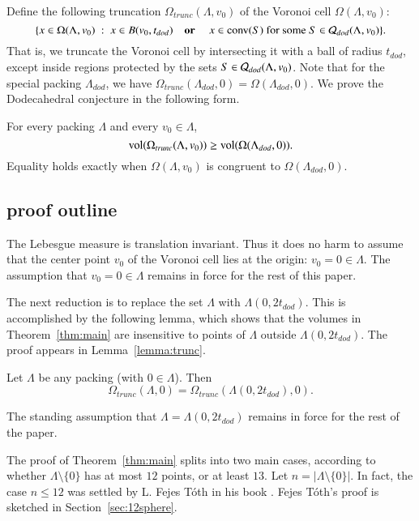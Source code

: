 Define the following truncation $\Omega_{trunc}(\Lambda,v_0)$ 
of the Voronoi cell $\Omega(\Lambda,v_0)$:
   $$
   \{x \in \Omega(\Lambda,v_0) \ :\    x\in B(v_0,t_{dod}) \quad\text{\bf  or }\quad x \in {\operatorname{conv}}(S)
     \text{ for some } S\in {\mathcal Q}_{dod}(\Lambda,v_0) \}. 
   $$
That is, we truncate the Voronoi cell by intersecting it with a ball of radius $t_{dod}$,
except inside regions protected by the sets $S\in{\mathcal Q}_{dod}(\Lambda,v_0)$.
Note that for the special packing $\Lambda_{dod}$, we have 
$\Omega_{trunc}(\Lambda_{dod},0) = \Omega(\Lambda_{dod},0)$.
We prove the  Dodecahedral conjecture in the following form.

\begin{theorem}\label{thm:main}
For every packing $\Lambda$ and every $v_0\in\Lambda$,
   $$
   {\operatorname{vol}}(\Omega_{trunc}(\Lambda,v_0))\ge {\operatorname{vol}}(\Omega(\Lambda_{dod},0)).
   $$
Equality holds exactly when $\Omega(\Lambda,v_0)$ is congruent to
$\Omega(\Lambda_{dod},0)$.
\end{theorem}





\subsection{proof outline}

The Lebesgue measure is translation invariant.  Thus it does no
harm to assume that the center point $v_0$ of the Voronoi cell
lies at the origin: $v_0 = 0 \in \Lambda$.  The assumption that
$v_0=0 \in\Lambda$ remains in force for the rest of this paper.


The next reduction is to replace the set $\Lambda$ with $\Lambda(0,2t_{dod})$.
This is accomplished by the following lemma, which shows that the
volumes in Theorem~\ref{thm:main} are insensitive to points of $\Lambda$
outside $\Lambda(0,2t_{dod})$.  The proof appears in Lemma~\ref{lemma:trunc}.


\begin{lemma} Let $\Lambda$ be any packing (with $0\in \Lambda$).
Then
$$\Omega_{trunc}(\Lambda,0) = \Omega_{trunc}(\Lambda(0,2t_{dod}),0).$$
\end{lemma}

The standing assumption that $\Lambda=\Lambda(0,2t_{dod})$ remains in force
for the rest of the paper.

The proof of Theorem~\ref{thm:main}
splits into two main cases, according to whether
$\Lambda\setminus\{0\}$ has at most $12$ points, or at least $13$.
Let $n=|\Lambda\setminus\{0\}|$.  In fact, the case $n\le 12$ was
settled by L. Fejes T\'oth in his book \cite{Toth2}.  Fejes T\'oth's proof
is sketched in Section~\ref{sec:12sphere}.

